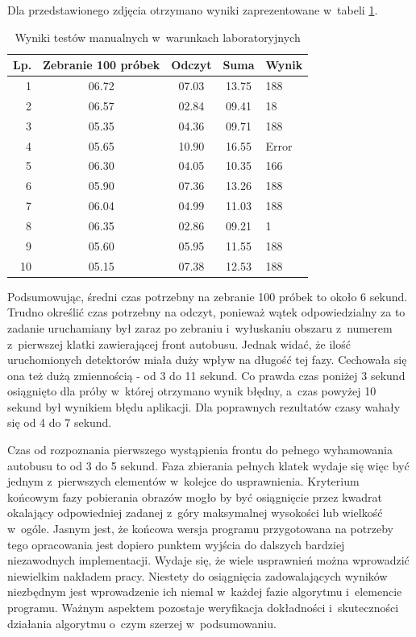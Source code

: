 Dla przedstawionego zdjęcia otrzymano wyniki zaprezentowane
w~tabeli \ref{tab:imp_lab_final_test_result}.

\begin{table}[!h]
    \centering
    \begin{tabular}{r c c c l }
        Lp. & Zebranie 100 próbek   & Odczyt    & Suma  & Wynik \\ \hline
        1   & 06.72                 & 07.03     & 13.75 & 188   \\
        2   & 06.57                 & 02.84     & 09.41 & 18    \\
        3   & 05.35                 & 04.36     & 09.71 & 188   \\
        4   & 05.65                 & 10.90     & 16.55 & Error \\
        5   & 06.30                 & 04.05     & 10.35 & 166   \\
        6   & 05.90                 & 07.36     & 13.26 & 188   \\
        7   & 06.04                 & 04.99     & 11.03 & 188   \\
        8   & 06.35                 & 02.86     & 09.21 & 1     \\
        9   & 05.60                 & 05.95     & 11.55 & 188   \\
        10  & 05.15                 & 07.38     & 12.53 & 188   \\
    \end{tabular}
    \caption{Wyniki testów manualnych w~warunkach laboratoryjnych}
    \label{tab:imp_lab_final_test_result}
\end{table}

Podsumowując, średni czas potrzebny na zebranie 100 próbek to około 6
sekund. Trudno określić czas potrzebny na odczyt, ponieważ 
wątek odpowiedzialny za to zadanie uruchamiany był zaraz 
po zebraniu i~wyłuskaniu obszaru z~numerem z~pierwszej klatki 
zawierającej front autobusu. Jednak widać, że ilość uruchomionych
detektorów miała duży wpływ na długość tej fazy. Cechowała się
ona też dużą zmiennością - od 3 do 11 sekund. Co prawda czas 
poniżej 3 sekund osiągnięto dla próby w~której otrzymano wynik błędny,
a~czas powyżej 10 sekund był wynikiem błędu aplikacji. 
Dla poprawnych rezultatów czasy wahały się od 4 do 7 sekund.

Czas od rozpoznania pierwszego wystąpienia
frontu do pełnego wyhamowania autobusu to od 3 do 5 sekund. Faza zbierania 
pełnych klatek wydaje się więc być jednym z~pierwszych elementów 
w~kolejce do usprawnienia. Kryterium końcowym fazy pobierania obrazów
mogło by być osiągnięcie przez kwadrat okalający odpowiedniej 
zadanej z~góry maksymalnej wysokości lub wielkość w~ogóle. 
Jasnym jest, że końcowa wersja programu przygotowana na potrzeby
tego opracowania jest dopiero punktem wyjścia do dalszych 
bardziej niezawodnych implementacji. Wydaje się, że wiele usprawnień
można wprowadzić niewielkim nakładem pracy. Niestety 
do osiągnięcia zadowalających wyników niezbędnym jest wprowadzenie
ich niemal w~każdej fazie algorytmu i~elemencie programu. 
Ważnym aspektem pozostaje weryfikacja dokładności i~skuteczności
działania algorytmu o~czym szerzej w~podsumowaniu.


